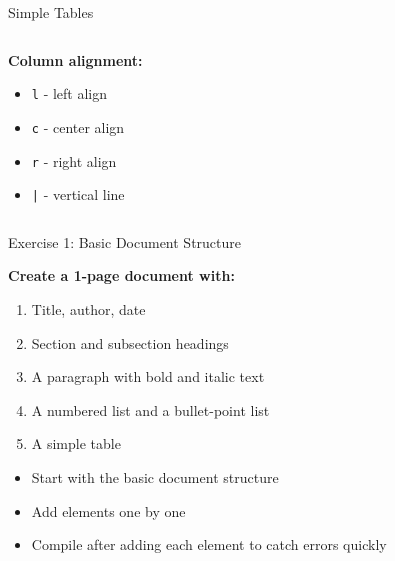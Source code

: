 \begin{frame}[fragile]{Simple Tables}
\begin{columns}
\begin{column}{0.5\textwidth}
            \textbf{Column alignment:}
            \begin{itemize}
                \item \texttt{l} - left align
                \item \texttt{c} - center align
                \item \texttt{r} - right align
                \item \texttt{|} - vertical line
            \end{itemize}
        \end{column}
    \end{columns}
\end{frame}

\begin{frame}{Exercise 1: Basic Document Structure}
    \begin{practice}
        \textbf{Create a 1-page document with:}
        \begin{enumerate}
            \item Title, author, date
            \item Section and subsection headings
            \item A paragraph with bold and italic text
            \item A numbered list and a bullet-point list
            \item A simple table
        \end{enumerate}
    \end{practice}
    
    \begin{tip}
        \begin{itemize}
            \item Start with the basic document structure
            \item Add elements one by one
            \item Compile after adding each element to catch errors quickly
        \end{itemize}
    \end{tip}
\end{frame}
